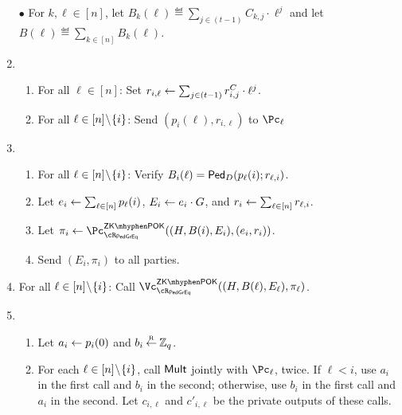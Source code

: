 \begin{protocol}
\begin{enumerate}
			\item[$\bullet$]  For $k,\ell \in [n]$, let $B_k(\ell)  \eqdef   \sum_{j\in (t-1)} C_{k,j} \cdot \ell^j$ and let $B(\ell) 
			\eqdef \sum_{k \in [n]} B_k(\ell) $. 
			
			\item  {}
			
			\begin{enumerate}
				\item For all $\ell \in [n]$: Set $r_{i,\ell} \leftarrow  \sum_{j\in (t-1)} r_{i,j}^C \cdot \ell^j$.   
				
				\item For all $\ell \in [n]\!\setminus\!\{i\}$: Send $(p_i(\ell),r_{i,\ell})$ to $\Pc_\ell$
			\end{enumerate}
			
	
			
			
			\item 	{}
			
			\begin{enumerate}
				\item 	For all $\ell\in [n]\!\setminus\!\{i\}$: Verify   $B_i(\ell) = \mathsf{Ped}_D(p_\ell(i);r_{\ell,i})$.
				
				\item Let $e_i \leftarrow  \sum_{\ell \in [n]} p_\ell(i)$, $E_i \leftarrow e_i \cdot G$, and $r_i 
				\leftarrow  \sum_{\ell \in [n]} r_{\ell,i}$.
				
				
				\item Let $\pi_i \asn \pZKPOK{\rPedGEq}((H,B(i),E_i),(e_i,r_i ))$.
				
				
				\item Send $(E_i,\pi_i)$ to all parties.
			\end{enumerate}
		
				
		\item For all $\ell\in [n]\!\setminus\!\{i\}$: Call $\vZKPOK{\rPedGEq}((H,B(\ell),E_\ell),\pi_\ell)$.
		
		
		
		\item 	{}
		

		\begin{enumerate}
			
			
			\item Let $a_i \leftarrow p_i(0)$ and $b_i \mathbin{\stackrel{\mbox{\tiny R}}{\leftarrow}} {\mathbb Z}_q$.
			
			\item For each $\ell \in [n]\!\setminus\!\{i\}$, call $\mathsf{Mult}$ jointly with $\Pc_\ell$, twice. If $\ell < i$, use $a_i$ in the first call and $b_i$ in the second; otherwise, use  $b_i$ in the first call and $a_i$ in the second.    Let $c_{i,\ell}$ and $c'_{i,\ell}$ be the private  outputs of these calls.
			

\end{enumerate}
\end{enumerate}
\end{protocol}
